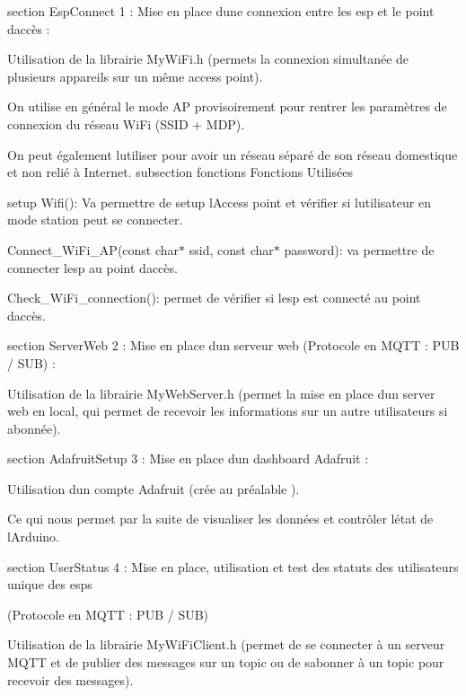 section Esp\+Connect 1 \+: Mise en place d\textquotesingle{}une connexion entre les esp et le point d\textquotesingle{}accès \+:
\begin{DoxyItemize}
\item Utilisation de la librairie My\+Wi\+Fi.\+h (permets la connexion simultanée de plusieurs appareils sur un même access point).
\item On utilise en général le mode AP provisoirement pour rentrer les paramètres de connexion du réseau Wi\+Fi (SSID + MDP).
\item On peut également l\textquotesingle{}utiliser pour avoir un réseau séparé de son réseau domestique et non relié à Internet. subsection fonctions Fonctions Utilisées
\begin{DoxyItemize}
\item setup Wifi()\+: Va permettre de setup l\textquotesingle{}Access point et vérifier si l\textquotesingle{}utilisateur en mode station peut se connecter.
\item Connect\+\_\+\+Wi\+Fi\+\_\+\+AP(const char$\ast$ ssid, const char$\ast$ password)\+: va permettre de connecter l\textquotesingle{}esp au point d\textquotesingle{}accès.
\item Check\+\_\+\+Wi\+Fi\+\_\+connection()\+: permet de vérifier si l\textquotesingle{}esp est connecté au point d\textquotesingle{}accès.
\end{DoxyItemize}
\end{DoxyItemize}

section Server\+Web 2 \+: Mise en place d\textquotesingle{}un serveur web (Protocole en MQTT \+: PUB / SUB) \+:
\begin{DoxyItemize}
\item Utilisation de la librairie My\+Web\+Server.\+h (permet la mise en place d\textquotesingle{}un server web en local, qui permet de recevoir les informations sur un autre utilisateurs si abonnée).
\end{DoxyItemize}

section Adafruit\+Setup 3 \+: Mise en place d\textquotesingle{}un dashboard Adafruit \+:
\begin{DoxyItemize}
\item Utilisation d\textquotesingle{}un compte Adafruit (crée au préalable ).
\item Ce qui nous permet par la suite de visualiser les données et contrôler l\textquotesingle{}état de l\textquotesingle{}Arduino.
\end{DoxyItemize}

section User\+Status 4 \+: Mise en place, utilisation et test des statuts des utilisateurs unique des esps
\begin{DoxyItemize}
\item (Protocole en MQTT \+: PUB / SUB)
\item Utilisation de la librairie My\+Wi\+Fi\+Client.\+h (permet de se connecter à un serveur MQTT et de publier des messages sur un topic ou de s\textquotesingle{}abonner à un topic pour recevoir des messages).
\end{DoxyItemize}

